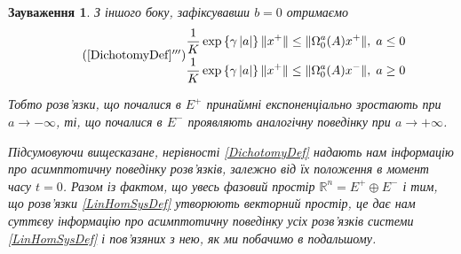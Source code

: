 \documentclass[14pt]{extarticle} %
\newtheorem{remark}{Зауваження}
\begin{document}
\begin{remark}
З іншого боку, зафіксувавши $b=0$ отримаємо
\begin{equation*}
	\tag{\ref*{DichotomyDef}$'''$}
	\begin{aligned}
	\frac{1}{K}\exp\left\{\gamma\myabs{a}\right\}\mynorm{{x}^+}\leq \mynorm{\Omega_0^a(A){x}^+},\; a\leq 0\\
	\frac{1}{K}\exp\left\{\gamma\myabs{a}\right\}\mynorm{{x}^+}\leq \mynorm{\Omega_0^a(A){x}^-},\;a\geq 0\\
\end{aligned}\end{equation*}

Тобто розв’язки, що почалися в $E^+$ принаймні 
експоненціально зростають при $a\to-\infty$, ті, що почалися в $E^-$ проявляють аналогічну поведінку при 
$a\to+\infty$. 

Підсумовуючи вищесказане, нерівності \ref{DichotomyDef} надають нам інформацію про асимптотичну поведінку розв’язків, залежно
від їх положення в момент часу $t=0$. Разом із фактом, що увесь фазовий простір $\mathbb{R}^n=E^+\oplus E^-$ і тим, що 
розв’язки \ref{LinHomSysDef} утворюють векторний простір, це дає нам суттєву інформацію про асимптотичну поведінку усіх розв’язків
системи \ref{LinHomSysDef} і пов’язяних з нею, як ми побачимо в подальшому.
\end{remark}
\end{document}
